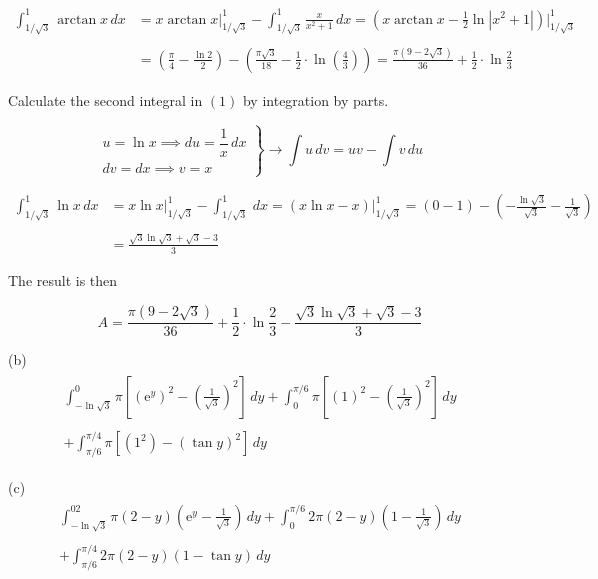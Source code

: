 \documentclass{article}
\begin{document}
\begin{align*}\int_{1/\sqrt3}^1\arctan x\,dx&=x\arctan x\bigg|_{1/\sqrt3}^1-\int_{1/\sqrt3}^1\frac{x}{x^2+1}\,dx=\left(x\arctan x-\frac12\ln\left|x^2+1\right|\right)\Bigg|_{1/\sqrt3}^1\\\\&=\left(\frac\pi4-\frac{\ln 2}2\right)-\left(\frac{\pi\sqrt3}{18}-\frac12\cdot\ln\left(\frac43\right)\right)=\frac{\pi\left(9-2\sqrt3\right)}{36}+\frac12\cdot\ln\frac23\end{align*}

\hfill

\noindent Calculate the second integral in $(1)$ by integration by parts.

\[\left.\begin{array}{c}
u=\ln x\implies du=\dfrac1x\,dx\\[1em]
dv=dx\implies v=x
\end{array}\right\}\rightarrow \int u\,dv=uv-\int v\,du\]

\begin{align*}\int_{1/\sqrt3}^1\ln x\,dx&=x\ln x\bigg|_{1/\sqrt3}^1-\int_{1/\sqrt3}^1\,dx=\left(x\ln x-x\right)\Bigg|_{1/\sqrt3}^1=\left(0-1\right)-\left(-\frac{\ln\sqrt3}{\sqrt3}-\frac1{\sqrt3}\right)\\\\&=\frac{\sqrt3\ln\sqrt3+\sqrt3-3}3\end{align*}

\hfill

\noindent The result is then

\[A=\boxed{\frac{\pi\left(9-2\sqrt3\right)}{36}+\frac12\cdot\ln\frac23-\frac{\sqrt3\ln\sqrt3+\sqrt3-3}3}\]

\hfill

\noindent (b)
\begin{align*}\boxed{\begin{array}{l}\displaystyle\int_{-\ln\sqrt3}^0\pi\left[\left(\mathrm{e}^y\right)^2-\left(\frac1{\sqrt3}\right)^2\right]\,dy+\int_0^{\pi/6}\pi\left[(1)^2-\left(\frac1{\sqrt3}\right)^2\right]\,dy\\\\\displaystyle+\int_{\pi/6}^{\pi/4}\pi\left[(1^2)-\left(\tan y\right)^2\right]\,dy\end{array}}\end{align*}

\hfill

\noindent (c)
\begin{align*}\boxed{\begin{array}{l}\displaystyle\int_{-\ln\sqrt3}^02\pi\left(2-y\right)\left(\mathrm{e}^y-\frac1{\sqrt3}\right)\,dy+\int_0^{\pi/6}2\pi\left(2-y\right)\left(1-\frac1{\sqrt3}\right)\,dy\\\\\displaystyle+\int_{\pi/6}^{\pi/4}2\pi\left(2-y\right)\left(1-\tan y\right)\,dy\end{array}}\end{align*}
\end{document}
